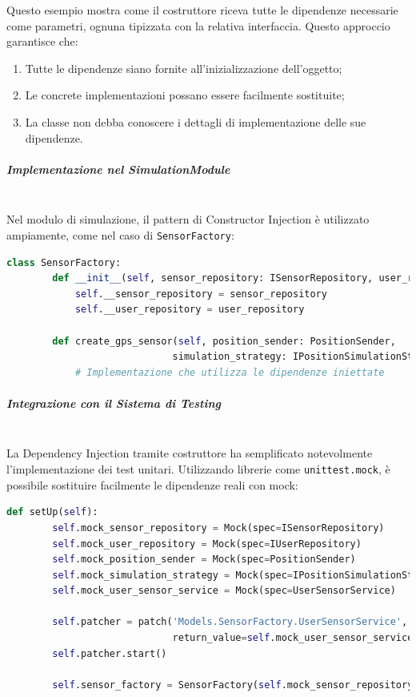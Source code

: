 \documentclass[10pt]{article}
\newcommand{\mysubparagraph}[1]{\subparagraph{#1}\mbox{}\\}
\begin{document}
    Questo esempio mostra come il costruttore riceva tutte le dipendenze necessarie come parametri, ognuna tipizzata con la relativa interfaccia. Questo approccio garantisce che:
    
    \begin{enumerate}
        \item Tutte le dipendenze siano fornite all'inizializzazione dell'oggetto;
        \item Le concrete implementazioni possano essere facilmente sostituite;
        \item La classe non debba conoscere i dettagli di implementazione delle sue dipendenze.
    \end{enumerate}
    
    \mysubparagraph{Implementazione nel SimulationModule}
    
    Nel modulo di simulazione, il pattern di Constructor Injection è utilizzato ampiamente, come nel caso di \texttt{SensorFactory}:
    
    \begin{lstlisting}[language=Python, caption=Esempio di Constructor Injection in SensorFactory]
    class SensorFactory:
        def __init__(self, sensor_repository: ISensorRepository, user_repository: IUserRepository):
            self.__sensor_repository = sensor_repository
            self.__user_repository = user_repository
            
        def create_gps_sensor(self, position_sender: PositionSender, 
                             simulation_strategy: IPositionSimulationStrategy) -> GpsSensor:
            # Implementazione che utilizza le dipendenze iniettate
    \end{lstlisting}
    
    \mysubparagraph{Integrazione con il Sistema di Testing}
    
    La Dependency Injection tramite costruttore ha semplificato notevolmente l'implementazione dei test unitari. Utilizzando librerie come \texttt{unittest.mock}, è possibile sostituire facilmente le dipendenze reali con mock:
    
    \begin{lstlisting}[language=Python, caption=Test di un componente con Constructor Injection]
    def setUp(self):
        self.mock_sensor_repository = Mock(spec=ISensorRepository)
        self.mock_user_repository = Mock(spec=IUserRepository)
        self.mock_position_sender = Mock(spec=PositionSender)
        self.mock_simulation_strategy = Mock(spec=IPositionSimulationStrategy)
        self.mock_user_sensor_service = Mock(spec=UserSensorService)
    
        self.patcher = patch('Models.SensorFactory.UserSensorService', 
                             return_value=self.mock_user_sensor_service)
        self.patcher.start()
    
        self.sensor_factory = SensorFactory(self.mock_sensor_repository, self.mock_user_repository)
    \end{lstlisting}
    
\end{document}
